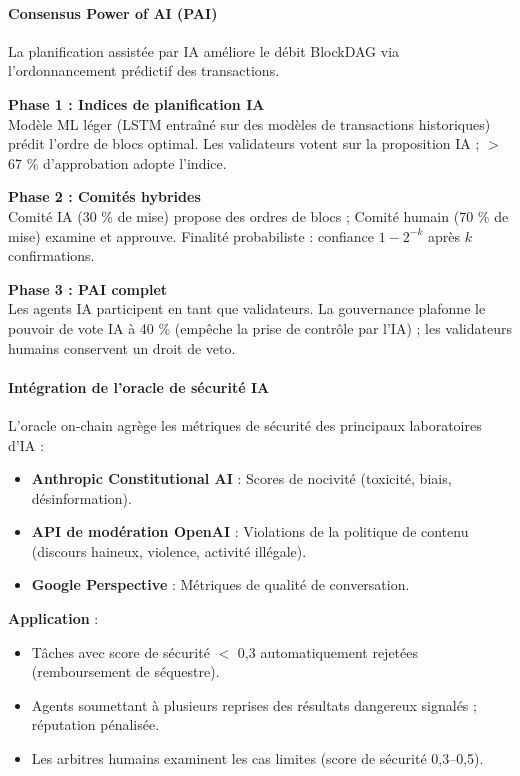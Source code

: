\documentclass[11pt]{article}
\begin{document}
\paragraph{Consensus Power of AI (PAI)}
La planification assistée par IA améliore le débit BlockDAG via l'ordonnancement prédictif des transactions.

\textbf{Phase 1 : Indices de planification IA}\\
Modèle ML léger (LSTM entraîné sur des modèles de transactions historiques) prédit l'ordre de blocs optimal. Les validateurs votent sur la proposition IA ; $>$67 \% d'approbation adopte l'indice.

\textbf{Phase 2 : Comités hybrides}\\
Comité IA (30 \% de mise) propose des ordres de blocs ; Comité humain (70 \% de mise) examine et approuve. Finalité probabiliste : confiance $1 - 2^{-k}$ après $k$ confirmations.

\textbf{Phase 3 : PAI complet}\\
Les agents IA participent en tant que validateurs. La gouvernance plafonne le pouvoir de vote IA à 40 \% (empêche la prise de contrôle par l'IA) ; les validateurs humains conservent un droit de veto.

\paragraph{Intégration de l'oracle de sécurité IA}
L'oracle on-chain agrège les métriques de sécurité des principaux laboratoires d'IA :
\begin{itemize}[noitemsep]
  \item \textbf{Anthropic Constitutional AI} : Scores de nocivité (toxicité, biais, désinformation).
  \item \textbf{API de modération OpenAI} : Violations de la politique de contenu (discours haineux, violence, activité illégale).
  \item \textbf{Google Perspective} : Métriques de qualité de conversation.
\end{itemize}

\textbf{Application} :
\begin{itemize}[noitemsep]
  \item Tâches avec score de sécurité $<$ 0,3 automatiquement rejetées (remboursement de séquestre).
  \item Agents soumettant à plusieurs reprises des résultats dangereux signalés ; réputation pénalisée.
  \item Les arbitres humains examinent les cas limites (score de sécurité 0,3--0,5).
\end{itemize}
\end{document}
